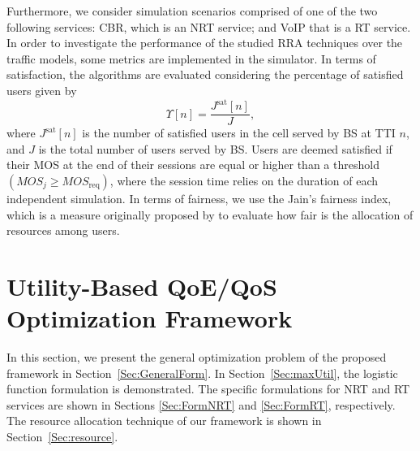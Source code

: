 \documentclass[conference]{IEEEtran}
\newcommand{\SecRef}[1]{Section~\ref{#1}}
\begin{document}

Furthermore, we consider simulation scenarios comprised of one of the two following services: \ac{CBR}, which is an \ac{NRT} service; and \ac{VoIP} that is a \ac{RT} service. In order to investigate the performance of the studied \ac{RRA} techniques over the traffic models, some metrics are implemented in the simulator. In terms of satisfaction, the algorithms are evaluated considering the percentage of satisfied users given by
%
\begin{equation}
\label{Eq:Satisfaction}
\Upsilon[n] = \dfrac{J^{\text{sat}} [n]}{J},
\end{equation}
%
where $J^{\text{sat}} [n]$ is the number of satisfied users in the cell served by \ac{BS} at \ac{TTI} $n$, and $J$ is the total number of users served by \ac{BS}. Users are deemed satisfied if their \ac{MOS} at the end of their sessions are equal or higher than a threshold $(MOS_j \geq MOS_{\text{req}})$, where the session time relies on the duration of each independent simulation.
In terms of fairness, we use the Jain's fairness index, which is a measure originally proposed by \cite{JainTR-3011984} to evaluate how fair is the allocation of resources among users.

\section{Utility-Based QoE/QoS Optimization Framework}	
\label{Sec:UtilFramework}		

In this section, we present the general optimization problem of the proposed framework in \SecRef{Sec:GeneralForm}. In \SecRef{Sec:maxUtil}, the logistic function formulation is demonstrated. The specific formulations for \ac{NRT} and \ac{RT} services are shown in Sections \ref{Sec:FormNRT} and \ref{Sec:FormRT}, respectively. The resource allocation technique of our framework is shown in \SecRef{Sec:resource}.
\end{document}
